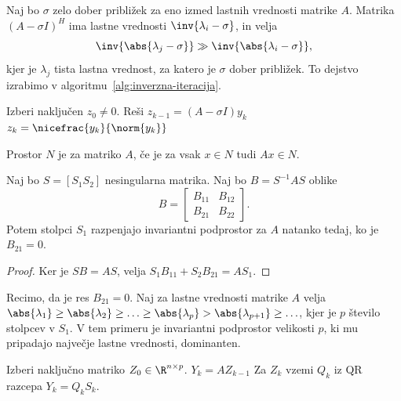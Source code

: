 Naj bo $\sigma$ zelo dober približek za eno izmed lastnih vrednosti matrike $A$.
Matrika $(A - \sigma I)^H$ ima lastne vrednosti $\inv{\lambda_i - \sigma}$, in
velja
\[
  \inv{\abs{\lambda_j - \sigma}} \gg \inv{\abs{\lambda_i - \sigma}},
\]
kjer je $\lambda_j$ tista lastna vrednost, za katero je $\sigma$ dober
približek.
To dejstvo izrabimo v algoritmu~\ref{alg:inverzna-iteracija}.

\begin{algorithm}
  \caption{Inverzna iteracija}
  \label{alg:inverzna-iteracija}
  \begin{algorithmic}
	\State Izberi naključen $z_0 \ne 0$.
	\State Reši $z_{k-1} = (A - \sigma I) y_k$
	\State $z_k = \nicefrac{y_k}{\norm{y_k}}$
	\EndFor
  \end{algorithmic}
\end{algorithm}



\begin{definicija}
  Prostor $N$ je  za matriko $A$, če je za vsak $x
  \in N$ tudi $Ax \in N$.
\end{definicija}

\begin{izrek}
  Naj bo $S = [S_1 S_2]$ nesingularna matrika.
  Naj bo $B = S^{-1} A S$ oblike
  \[
	B =
	\begin{bmatrix}
	  B_{11} & B_{12} \\ B_{21} & B_{22}
	\end{bmatrix}.
  \]
  Potem stolpci $S_1$ razpenjajo invariantni podprostor za $A$ natanko tedaj, ko
  je $B_{21} = 0$.
\end{izrek}

\begin{proof}
  Ker je $SB = AS$, velja $S_1 B_{11} + S_2 B_{21} = AS_1$.
\end{proof}

Recimo, da je res $B_{21} = 0$.
Naj za lastne vrednosti matrike $A$ velja $\abs{\lambda_1} \ge \abs{\lambda_2}
\ge \ldots \ge \abs{\lambda_p} > \abs{\lambda_{p+1}} \ge \ldots$, kjer je $p$
število stolpcev v $S_1$.
V tem primeru je invariantni podprostor velikosti $p$, ki mu pripadajo največje
lastne vrednosti, dominanten.

\begin{algorithm}
  \caption{Ortogonalna iteracija}
  \label{alg:ortogonalna-iteracija}
  \begin{algorithmic}
	\State Izberi naključno matriko $Z_0 \in \R^{n \times p}$.
	\State $Y_k = A Z_{k-1}$
	\State Za $Z_k$ vzemi $Q_k$ iz QR razcepa $Y_k = Q_k S_k$.
	\EndFor
  \end{algorithmic}
\end{algorithm}

